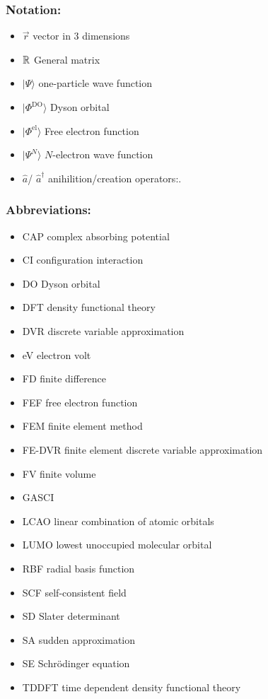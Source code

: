 \subsubsection{Notation:}
\begin{itemize}
   \item $\vec{r}$ vector in $3$ dimensions
   \item $\mathbb{R}$ General matrix
   \item $|\Psi\rangle$ one-particle wave function
   \item $|\Phi^\text{DO}\rangle$ Dyson orbital
   \item $|\Phi^\text{el}\rangle$ Free electron function
   \item $|\Psi^N\rangle$ $N$-electron wave function
   \item  $\hat{a}$/ $\hat{a}^\dagger$ anihilition/creation operators:.
\end{itemize}

\subsubsection{Abbreviations:}
\begin{itemize}
   \item CAP complex absorbing potential
   \item CI configuration interaction
   \item DO Dyson orbital
   \item DFT density functional theory
   \item DVR discrete variable approximation
   \item eV electron volt
   \item FD finite difference
   \item FEF free electron function
   \item FEM finite element method
   \item FE-DVR finite element discrete variable approximation
   \item FV finite volume
   \item GASCI 
   \item LCAO linear combination of atomic orbitals
   \item LUMO lowest unoccupied molecular orbital
   \item RBF radial basis function
   \item SCF self-consistent field
   \item SD Slater determinant
   \item SA sudden approximation
   \item SE Schr\"odinger equation
   \item TDDFT time dependent density functional theory
\end{itemize}

